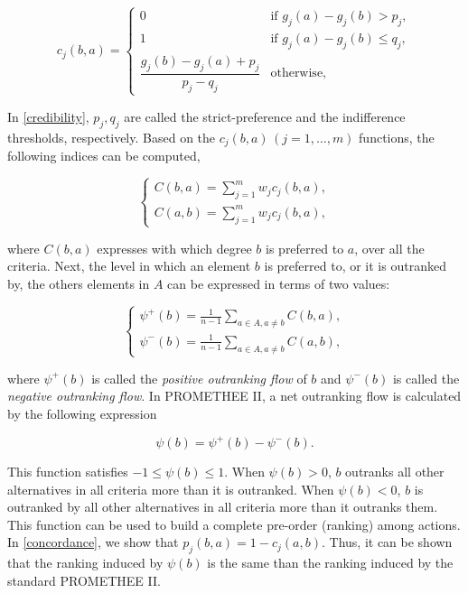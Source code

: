 \documentclass[]{elsarticle}
\theoremstyle{definition}
\begin{document}
{\footnotesize
\begin{equation}
c_j(b,a) =
\begin{cases}
	0							& \mbox{if  $g_j(a)-g_j(b) > p_j$}, \\
	1							& \mbox{if  $g_j(a)-g_j(b) \leq q_j$},   \\
	\dfrac{g_j(b)-g_j(a)+p_j}{p_j-q_j} 	& \mbox{otherwise}, 				     	      
 \end{cases} 
 \label{credibility}
 \end{equation} 
}

\noindent
In \eqref{credibility}, $p_j, q_j$ are called the strict-preference and the indifference thresholds, respectively. Based on the $c_j(b,a) \,(j=1,\ldots,m)$ functions, the following indices can be computed,

\begin{equation}
\begin{cases}
C(b,a)= \sum_{j=1}^{m} w_jc_j(b,a) , \\
C(a,b)= \sum_{j=1}^{m} w_jc_j(b,a),
\end{cases}\label{indices}	
\end{equation}

\noindent
where $C(b,a)$ expresses with which degree  $b$ is preferred to $a$, over all the criteria.   Next, the level in which an element $b$ is preferred to, or it is outranked by,  the others elements in $A$ can be expressed in terms of two values: 

\begin{equation}
\begin{cases}
\psi^+(b)=\frac{1}{n-1} \sum_{a \in A, a \neq b} C(b,a) , \\
\psi^-(b)= \frac{1}{n-1}\sum_{a \in A, a \neq b} C(a,b),
\end{cases}\label{indices}
\end{equation}

\noindent
where $\psi^+(b)$ is called the \emph{positive outranking flow} of $b$ and $\psi^-(b)$ is called the \emph{negative outranking flow}.  In PROMETHEE II, a net outranking flow is calculated by the following expression

\begin{equation}
\psi(b)=\psi^+(b)-\psi^-(b). \label{phi}
\end{equation}

\noindent
This function satisfies $-1\leq \psi(b) \leq 1$. When $\psi(b)>0$, $b$ outranks all other alternatives in all criteria more than it is outranked. When $\psi(b)<0$,  $b$ is outranked by all other alternatives in all criteria more than it outranks them. This function can be used to build a complete pre-order (ranking) among actions. In \ref{concordance}, we show that $p_j(b,a)=1-c_j(a,b)$. Thus, it can be shown that the ranking induced by $\psi(b)$ is the same than the ranking induced by the standard PROMETHEE II.
\end{document}
